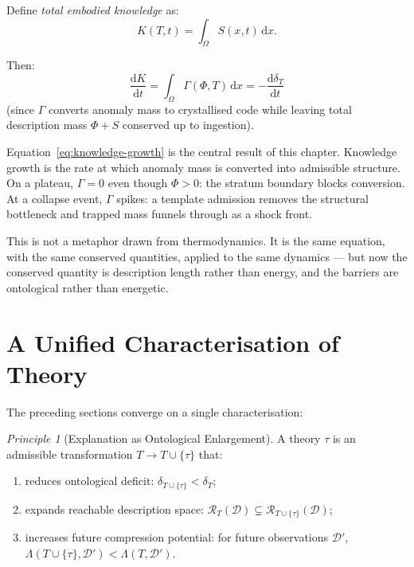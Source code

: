 \documentclass[11pt, a4paper, openany]{book}
\theoremstyle{plain}
\theoremstyle{definition}
\theoremstyle{remark}
\newtheorem{principle}{Principle}
\begin{document}
Define \emph{total embodied knowledge} as:
\begin{equation}
  K(T, t) = \int_\Omega S(x, t)\,\mathrm{d}x.
  \label{eq:knowledge-integral}
\end{equation}

Then:
\begin{equation}
  \frac{\mathrm{d}K}{\mathrm{d}t}
  = \int_\Omega \Gamma(\Phi, T)\,\mathrm{d}x
  = -\frac{\mathrm{d}\delta_T}{\mathrm{d}t}
  \label{eq:knowledge-growth}
\end{equation}
(since $\Gamma$ converts anomaly mass to crystallised code while
leaving total description mass $\Phi + S$ conserved up to ingestion).

Equation~\eqref{eq:knowledge-growth} is the central result of this chapter.
Knowledge growth is the rate at which anomaly mass is converted into
admissible structure.
On a plateau, $\Gamma = 0$ even though $\Phi > 0$: the stratum boundary
blocks conversion.
At a collapse event, $\Gamma$ spikes: a template admission removes the
structural bottleneck and trapped mass funnels through as a shock front.

This is not a metaphor drawn from thermodynamics.
It is the same equation, with the same conserved quantities, applied to
the same dynamics --- but now the conserved quantity is description length
rather than energy, and the barriers are ontological rather than energetic.

\section{A Unified Characterisation of Theory}

The preceding sections converge on a single characterisation:

\begin{principle}[Explanation as Ontological Enlargement]
  A theory $\tau$ is an admissible transformation
  $T \to T \cup \{\tau\}$ that:
  \begin{enumerate}
    \item reduces ontological deficit: $\delta_{T \cup \{\tau\}} < \delta_T$;
    \item expands reachable description space:
      $\mathcal{R}_T(\mathcal{D}) \subsetneq \mathcal{R}_{T \cup \{\tau\}}(\mathcal{D})$;
    \item increases future compression potential:
      for future observations $\mathcal{D}'$,
      $\Lambda(T \cup \{\tau\}, \mathcal{D}') < \Lambda(T, \mathcal{D}')$.
  \end{enumerate}
\end{principle}
\end{document}
